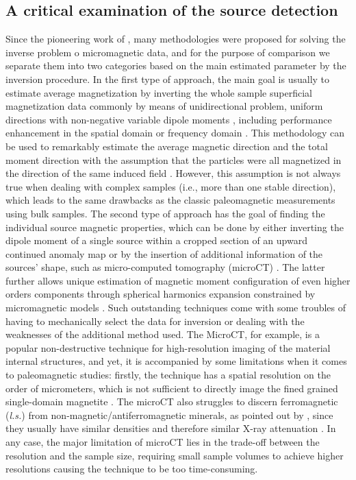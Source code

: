 \subsection{A critical examination of the source detection}

Since the pioneering work of \cite{Egli2000}, many methodologies were proposed for solving the inverse problem o micromagnetic data, and for the purpose of comparison we separate them into two categories based on the main estimated parameter by the inversion procedure.
In the first type of approach, the main goal is usually to estimate average magnetization by inverting the whole sample superficial magnetization data commonly by means of unidirectional problem, uniform directions with non-negative variable dipole moments \citep[e.g.,][]{Weiss2007}, including performance enhancement in the spatial domain \citep[e.g.,][]{Myre2019} or frequency domain  \citep[e.g.,][]{Lima2013}.
This methodology can be used to remarkably estimate the average magnetic direction and the total moment direction with the assumption that the particles were all magnetized in the direction of the same induced field \citep[sIRM and/or NRM in basalts,][]{Weiss2007}.
However, this assumption is not always true when dealing with complex samples (i.e., more than one stable direction), which leads to the same drawbacks as the classic paleomagnetic measurements using bulk samples.
The second type of approach has the goal of finding the individual source magnetic properties, which can be done by either inverting the dipole moment of a single source within a cropped section of an upward continued anomaly map \citep[e.g.,][]{Lima2016, Fu2020} or by the insertion of additional information of the sources’ shape, such as micro-computed tomography (microCT) \citep[e.g.,][]{Fabian2019, DeGroot2018, DeGroot2021}.
The latter further allows unique estimation of magnetic moment configuration of even higher orders components through spherical harmonics expansion constrained by micromagnetic models \citep[e.g.,][]{CortesOrtuno2021, CortesOrtuno2022}.
Such outstanding techniques come with some troubles of having to mechanically select the data for inversion or dealing with the weaknesses of the additional method used.
The MicroCT, for example, is a popular non-destructive technique for high-resolution imaging of the material internal structures, and yet, it is accompanied by some limitations when it comes to paleomagnetic studies: firstly, the technique has a spatial resolution on the order of micrometers, which is not sufficient to directly image the fined grained single-domain magnetite \citep{DeGroot2018}.
The microCT also struggles to discern ferromagnetic (\textit{l.s.}) from non-magnetic/antiferromagnetic minerals, as pointed out by \cite{DeGroot2021}, since they usually have similar densities and therefore similar X-ray attenuation \citep{Cnudde2013}.
In any case, the major limitation of microCT lies in the trade-off between the resolution and the sample size, requiring small sample volumes to achieve higher resolutions causing the technique to be too time-consuming.


